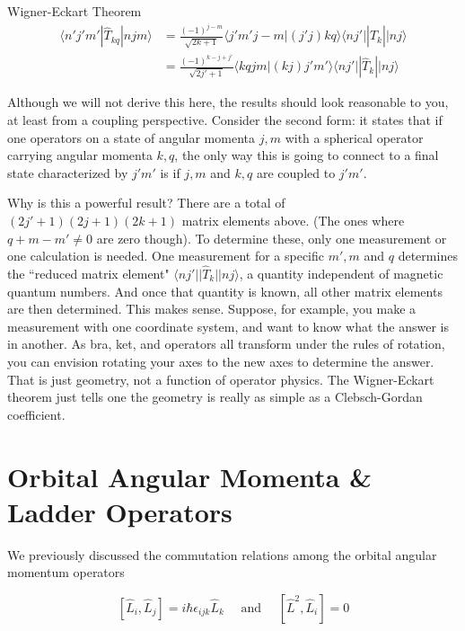 \begin{mainbox}{Wigner-Eckart Theorem}
  \begin{align*} \langle n' j' m' | \hat{T}_{kq} | njm \rangle
    &= \frac{(-1)^{j-m}}{\sqrt{2k+1}} \langle j' m' j - m | (j'j) kq \rangle
  \langle nj' ||\hat{T}_k || nj \rangle \\ &=
  \frac{(-1)^{k-j+j'}}{\sqrt{2j'+1}} \langle kq jm | (kj) j'm' \rangle \langle
nj' ||\hat{T}_k || nj\rangle \end{align*}
\end{mainbox}

Although we will not derive this here, the results should look reasonable to
you, at least from a coupling perspective. Consider the second form: it states
that if one operators on a state of angular momenta $j, m$ with a spherical
operator carrying angular momenta $k, q$, the only way this is going to connect
to a final state characterized by $j'm'$ is if $j,m$ and $k,q$ are coupled to
$j'm'$. 

Why is this a powerful result? There are a total of  $(2j' + 1)(2j+1)(2k+1)$
matrix elements above. (The ones where $q + m - m' \neq 0$ are zero though). To
determine these, only one measurement or one calculation is needed. One
measurement for a specific $m', m$ and $q$ determines the ``reduced matrix
element" $\langle n j' || \hat{T}_k || nj \rangle$, a quantity independent of
magnetic quantum numbers. And once that quantity is known, all other matrix
elements are then determined. This makes sense. Suppose, for example, you make
a measurement with one coordinate system, and want to know what the answer is
in another. As bra, ket, and operators all transform under the rules of
rotation, you can envision rotating your axes to the new axes to determine the
answer. That is just geometry, not a function of operator physics. The
Wigner-Eckart theorem just tells one the geometry is really as simple as
a Clebsch-Gordan coefficient. 

\section{Orbital Angular Momenta \& Ladder Operators}

We previously discussed the commutation relations among the orbital angular
momentum operators

\[
  [\hat{L}_i, \hat{L}_j ] = i\hbar \epsilon_{ijk} \hat{L}_k \quad \text{ and
  }  \quad [\hat{L}^2, \hat{L}_i] = 0
\] \vspace{3px}

